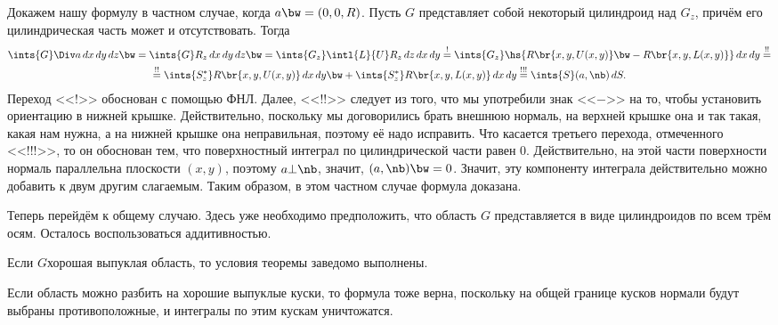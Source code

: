 \documentclass[a4paper]{article}
\begin{document}
Докажем нашу формулу в частном случае, когда $a \bw= (0,0,R)$. Пусть $G$ представляет собой
некоторый цилиндроид над $G_z$, причём его цилиндрическая часть может и отсутствовать. Тогда
\begin{multline*}
\ints{G} \Div a \,d x \,d y \,d z \bw= \ints{G} R_z\,d x \,d y \,d z \bw=
\ints{G_z} \intl{L}{U}R_z \,dz \,dx \,dy \stackrel{!}{=}
\ints{G_z} \hs{R\br{x,y,U(x,y)} \bw- R\br{x,y, L(x,y)}} \,d x \,d y \stackrel{!!}{=}\\ \stackrel{!!}{=}
\ints{S^*_z}R\br{x,y,U(x,y)}\,d x\,d y \bw+ \ints{S^*_z}R\br{x,y,L(x,y)}\,d x\,d y \stackrel{!!!}{=}
\ints{S}(a,\nb)\,d S.
\end{multline*}
Переход <<!>> обоснован с помощью ФНЛ. Далее, <<!!>> следует из того, что мы употребили знак <<$-$>> на то,
чтобы установить ориентацию в нижней крышке. Действительно, поскольку мы договорились брать внешнюю нормаль,
на верхней крышке она и так такая, какая нам нужна, а на нижней крышке она неправильная, поэтому её надо
исправить. Что касается третьего перехода, отмеченного <<!!!>>, то он обоснован тем, что поверхностный
интеграл по цилиндрической части равен 0. Действительно, на этой части поверхности нормаль параллельна
плоскости $(x,y)$, поэтому $a \bot \nb$, значит, $(a,\nb) \bw= 0$. Значит, эту компоненту интеграла
действительно можно добавить к двум другим слагаемым. Таким образом, в этом частном случае формула доказана.

Теперь перейдём к общему случаю. Здесь уже необходимо предположить, что область $G$ представляется в
виде цилиндроидов по всем трём осям. Осталось воспользоваться аддитивностью.

\begin{imp}
Если $G$\т хорошая выпуклая область, то условия теоремы заведомо выполнены.
\end{imp}

\begin{imp}
Если область можно разбить на хорошие выпуклые куски, то формула тоже верна, поскольку на общей границе кусков
нормали будут выбраны противоположные, и интегралы по этим кускам уничтожатся.
\end{imp}
\end{document}
